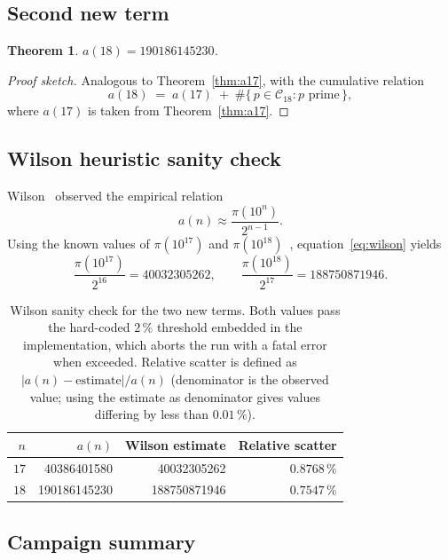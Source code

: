 \documentclass[11pt,a4paper]{article}
\newtheorem{theorem}{Theorem}
\theoremstyle{definition}
\begin{document}
\subsection{Second new term}

\begin{theorem}\label{thm:a18}
$a(18) = \num{190186145230}$.
\end{theorem}

\begin{proof}[Proof sketch]
Analogous to Theorem~\ref{thm:a17}, with the cumulative relation
\[
  a(18) \;=\; a(17) \;+\; \#\{\, p \in \mathcal{C}_{18} : p \text{ prime}\,\},
\]
where $a(17)$ is taken from Theorem~\ref{thm:a17}.
\end{proof}

\subsection{Wilson heuristic sanity check}

Wilson~\cite{Wilson-comment} observed the empirical relation
\begin{equation}\label{eq:wilson}
  a(n) \approx \frac{\pi(10^n)}{2^{n-1}}.
\end{equation}
Using the known values of $\pi(10^{17})$ and
$\pi(10^{18})$~\cite{primepi-table}, equation~\eqref{eq:wilson} yields
\[
  \frac{\pi(10^{17})}{2^{16}} = \num{40032305262}, \qquad
  \frac{\pi(10^{18})}{2^{17}} = \num{188750871946}.
\]

\begin{table}[ht]
  \centering
  \begin{tabular}{r r r r}
    \toprule
    $n$ & $a(n)$ & Wilson estimate & Relative scatter\\
    \midrule
    $17$ & \num{40386401580}  & \num{40032305262}  & $0.8768\,\%$\\
    $18$ & \num{190186145230} & \num{188750871946} & $0.7547\,\%$\\
    \bottomrule
  \end{tabular}
  \caption{Wilson sanity check for the two new terms. Both values pass
    the hard-coded $2\,\%$ threshold embedded in the implementation, which
    aborts the run with a fatal error when exceeded. Relative scatter is
    defined as $|a(n) - \text{estimate}| / a(n)$ (denominator is the
    observed value; using the estimate as denominator gives values
    differing by less than $0.01\,\%$).}
  \label{tab:wilson}
\end{table}

\subsection{Campaign summary}\label{sec:campaign}
\end{document}
